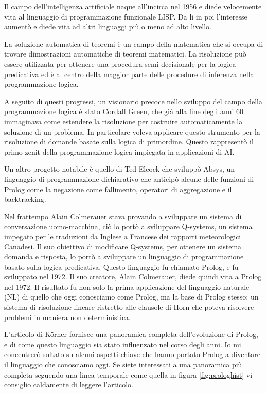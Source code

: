Il campo dell'intelligenza artificiale naque all'incirca nel 1956 e diede velocemente vita al linguaggio di programmazione funzionale LISP. Da li in poi 
l'interesse aumentò e diede vita ad altri linguaggi più o meno ad alto livello.

La soluzione automatica di teoremi è un campo della matematica che si occupa di trovare dimostrazioni automatiche di teoremi matematici. La risoluzione può essere utilizzata per ottenere una procedura semi-decisionale per la logica predicativa ed è al centro della maggior parte delle procedure di inferenza nella programmazione logica.

A seguito di questi progressi, un visionario precoce nello sviluppo del campo della programmazione logica è stato Cordall Green, che già alla fine degli anni 60 immaginava come estendere la risoluzione per costruire 
automaticamente la soluzione di un problema. In particolare voleva applicare questo strumento per la risoluzione di domande basate sulla logica di primordine. Questo rappresentò il primo zenit della programmazione logica impiegata in applicazioni di AI.

Un altro progetto notabile è quello di Ted Elcock che sviluppò Absys, un linguaggio di programmazione dichiarativo che anticipò alcune delle funzioni di Prolog come la negazione come fallimento, operatori di aggregazione e il backtracking.

Nel frattempo Alain Colmerauer stava provando a sviluppare un sistema di conversazione uomo-macchina, ciò lo portò a sviluppare Q-systems, un sistema impegato per le traduzioni da Inglese a Francese dei rapporti meteorologici Canadesi. 
Il suo obiettivo di modificare Q-systems, per ottenere un sistema domanda e risposta, lo portò a sviluppare un linguaggio di programmazione basato sulla logica predicativa. Questo linguaggio fu chiamato Prolog, e fu sviluppato nel 1972.
Il suo creatore, Alain Colmerauer, diede quindi vita a Prolog nel 1972. Il risultato fu non solo la prima applicazione del linguaggio naturale (NL) di quello che oggi conosciamo come Prolog, ma la base di Prolog stesso: un sistema di risoluzione
lineare ristretto alle clausole di Horn che poteva risolvere problemi in maniera non deterministica.

L'articolo di K{\"o}rner \cite{korner2022fifty} fornisce una panoramica completa dell'evoluzione di Prolog, e di come questo linguaggio sia stato influenzato nel corso degli anni. Io mi concentrerò soltato su alcuni aspetti chiave che hanno portato Prolog a diventare il linguaggio che conosciamo oggi.
Se siete interessati a una panoramica più completa seguendo una linea temporale come quella in figura \ref{fig:prologhist} vi consiglio caldamente di leggere l'articolo.
